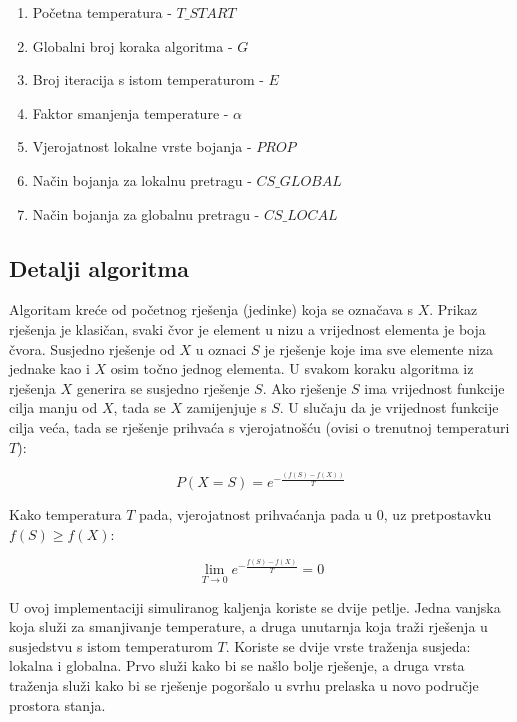 \documentclass[times, utf8, diplomski, numeric]{fer}
\begin{document}
\begin{enumerate}
	\item Početna temperatura - $T\_START$
	\item Globalni broj koraka algoritma - $G$
	\item Broj iteracija s istom temperaturom - $E$
	\item Faktor smanjenja temperature - $\alpha$
	\item Vjerojatnost lokalne vrste bojanja - $PROP$
	\item Način bojanja za lokalnu pretragu - $CS\_GLOBAL$
	\item Način bojanja za globalnu pretragu - $CS\_LOCAL$
\end{enumerate}

\subsection{Detalji algoritma}

Algoritam kreće od početnog rješenja (jedinke) koja se označava s $X$. Prikaz rješenja je klasičan, svaki čvor je element u nizu a vrijednost elementa je boja čvora. Susjedno rješenje od $X$ u oznaci $S$ je rješenje koje ima sve elemente niza jednake kao i $X$ osim točno jednog elementa. U svakom koraku algoritma iz rješenja $X$ generira se susjedno rješenje $S$. Ako rješenje $S$ ima vrijednost funkcije cilja manju od $X$, tada se $X$ zamijenjuje s $S$. U slučaju da je vrijednost funkcije cilja veća, tada se rješenje prihvaća s vjerojatnošću (ovisi o trenutnoj temperaturi $T$):
 
\begin{equation}
	P(X=S) = e^{-\frac{(f(S)-f(X))}{T}}
\end{equation}

Kako temperatura $T$ pada, vjerojatnost prihvaćanja pada u $0$, uz pretpostavku $f(S)\ge f(X)$:

\begin{equation}
	\lim_{T\rightarrow 0 } e^{-\frac{f(S)-f(X)}{T}} = 0	
\end{equation}

U ovoj implementaciji simuliranog kaljenja koriste se dvije petlje. Jedna vanjska koja služi za smanjivanje temperature, a druga unutarnja koja traži rješenja u susjedstvu s istom temperaturom $T$. Koriste se dvije vrste traženja susjeda: lokalna i globalna. Prvo služi kako bi se našlo bolje rješenje, a druga vrsta traženja služi kako bi se rješenje pogoršalo u svrhu prelaska u novo područje prostora stanja. 
\end{document}

